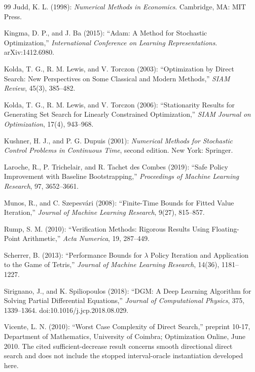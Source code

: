 \begin{thebibliography}{99}
Judd, K. L. (1998): \emph{Numerical Methods in Economics}. Cambridge, MA: MIT Press.


Kingma, D. P., and J. Ba (2015): ``Adam: A Method for Stochastic Optimization,'' \emph{International Conference on Learning Representations}. arXiv:1412.6980.


Kolda, T. G., R. M. Lewis, and V. Torczon (2003): ``Optimization by Direct Search: New Perspectives on Some Classical and Modern Methods,'' \emph{SIAM Review}, 45(3), 385--482.


Kolda, T. G., R. M. Lewis, and V. Torczon (2006): ``Stationarity Results for Generating Set Search for Linearly Constrained Optimization,'' \emph{SIAM Journal on Optimization}, 17(4), 943--968.


Kushner, H. J., and P. G. Dupuis (2001): \emph{Numerical Methods for Stochastic Control Problems in Continuous Time}, second edition. New York: Springer.


Laroche, R., P. Trichelair, and R. Tachet des Combes (2019): ``Safe Policy Improvement with Baseline Bootstrapping,'' \emph{Proceedings of Machine Learning Research}, 97, 3652--3661.

Munos, R., and C. Szepesv\'ari (2008): ``Finite-Time Bounds for Fitted Value Iteration,'' \emph{Journal of Machine Learning Research}, 9(27), 815--857.


Rump, S. M. (2010): ``Verification Methods: Rigorous Results Using Floating-Point Arithmetic,'' \emph{Acta Numerica}, 19, 287--449.


Scherrer, B. (2013): ``Performance Bounds for $\lambda$ Policy Iteration and Application to the Game of Tetris,'' \emph{Journal of Machine Learning Research}, 14(36), 1181--1227.

Sirignano, J., and K. Spiliopoulos (2018): ``DGM: A Deep Learning Algorithm for Solving Partial Differential Equations,'' \emph{Journal of Computational Physics}, 375, 1339--1364. doi:10.1016/j.jcp.2018.08.029.


Vicente, L. N. (2010): ``Worst Case Complexity of Direct Search,'' preprint 10-17, Department of Mathematics, University of Coimbra; Optimization Online, June 2010. The cited sufficient-decrease result concerns smooth directional direct search and does not include the stopped interval-oracle instantiation developed here.


\end{thebibliography}
